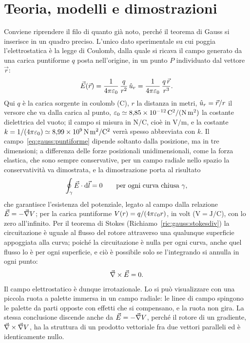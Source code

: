 \documentclass[11pt,a4paper]{article}
\begin{document}
\section*{Teoria, modelli e dimostrazioni}

Conviene riprendere il filo di quanto già noto, perché il teorema di Gauss si inserisce in un quadro preciso. L'unico dato sperimentale su cui poggia l'elettrostatica è la legge di Coulomb, dalla quale si ricava il campo generato da una carica puntiforme $q$ posta nell'origine, in un punto $P$ individuato dal vettore $\vec{r}$:
\begin{equation}
\vec{E}(\vec{r})=\frac{1}{4\pi\varepsilon_0}\,\frac{q}{r^2}\,\hat{u}_r=\frac{1}{4\pi\varepsilon_0}\,\frac{q\,\vec{r}}{r^3}.
\label{eq:gauss:puntiforme}
\end{equation}
Qui $q$ è la carica sorgente in coulomb (C), $r$ la distanza in metri, $\hat{u}_r=\vec{r}/r$ il versore che va dalla carica al punto, $\varepsilon_0\simeq 8{,}85\times10^{-12}\,\mathrm{C^2/(N\,m^2)}$ la costante dielettrica del vuoto; il campo si misura in $\mathrm{N/C}$, cioè in $\mathrm{V/m}$, e la costante $k=1/(4\pi\varepsilon_0)\simeq 8{,}99\times10^{9}\,\mathrm{N\,m^2/C^2}$ verrà spesso abbreviata con $k$. Il campo~\eqref{eq:gauss:puntiforme} dipende soltanto dalla posizione, ma in tre dimensioni; a differenza delle forze posizionali unidimensionali, come la forza elastica, che sono sempre conservative, per un campo radiale nello spazio la conservatività va dimostrata, e la dimostrazione porta al risultato
\[
\oint_\gamma\vec{E}\cdot\mathrm{d}\vec{l}=0\qquad\text{per ogni curva chiusa }\gamma ,
\]
che garantisce l'esistenza del potenziale, legato al campo dalla relazione $\vec{E}=-\vec{\nabla} V$; per la carica puntiforme $V(r)=q/(4\pi\varepsilon_0 r)$, in volt ($\mathrm{V}=\mathrm{J/C}$), con lo zero all'infinito. Per il teorema di Stokes (Richiamo~\ref{ric:gauss:stokesdiv}) la circuitazione è uguale al flusso del rotore attraverso una qualunque superficie appoggiata alla curva; poiché la circuitazione è nulla per ogni curva, anche quel flusso lo è per ogni superficie, e ciò è possibile solo se l'integrando si annulla in ogni punto:
\[
\vec{\nabla}\times\vec{E}=0.
\]
Il campo elettrostatico è dunque irrotazionale. Lo si può visualizzare con una piccola ruota a palette immersa in un campo radiale: le linee di campo spingono le palette da parti opposte con effetti che si compensano, e la ruota non gira. La stessa conclusione discende anche da $\vec{E}=-\vec{\nabla} V$, perché il rotore di un gradiente, $\vec{\nabla}\times\vec{\nabla} V$, ha la struttura di un prodotto vettoriale fra due vettori paralleli ed è identicamente nullo. 
\end{document}
